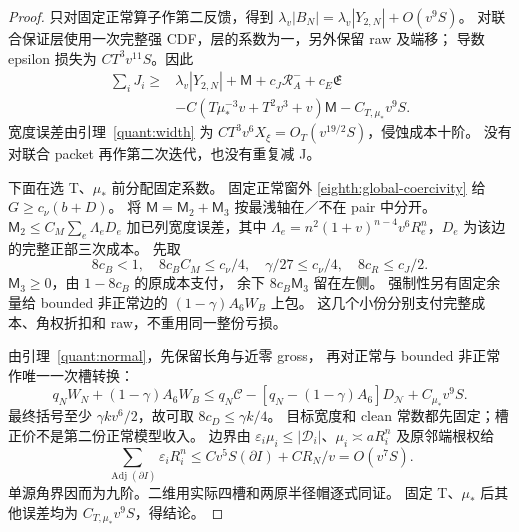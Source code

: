 \begin{proof}
只对固定正常算子作第二反馈，得到
\(\lambda_v|B_N|=\lambda_v|Y_{2,N}|+O(v^9S)\)。
对联合保证层使用一次完整强 CDF，层的系数为一，另外保留 raw 及端移；
导数 epsilon 损失为 \(CT^3v^{11}S\)。因此
\[
 \begin{aligned}
 \sum_iJ_i\ge{}&\lambda_v|Y_{2,N}|+\mathsf M+c_J\mathcal R_A^-+c_E\mathfrak E\\
 &-C(T\mu_*^{-3}v+T^2v^3+v)\mathsf M-C_{T,\mu_*}v^9S.
 \end{aligned}
\]
宽度误差由引理~\ref{quant:width} 为
\(CT^3v^6X_\xi=O_T(v^{19/2}S)\)，侵蚀成本十阶。
没有对联合 packet 再作第二次迭代，也没有重复减 J。

下面在选 T、\(\mu_*\) 前分配固定系数。
固定正常窗外 \eqref{eighth:global-coercivity} 给 \(G\ge c_\nu(b+D)\)。
将 \(\mathsf M=\mathsf M_2+\mathsf M_3\) 按最浅轴在／不在 pair 中分开。
\(\mathsf M_2\le C_M\sum_e\Lambda_eD_e\) 加已列宽度误差，其中
\(\Lambda_e=n^2(1+v)^{n-4}v^6R_e^n\)，\(D_e\) 为该边的完整正部三次成本。
先取
\[
 8c_B<1,\quad8c_BC_M\le c_\nu/4,\quad
 \gamma/27\le c_\nu/4,\quad8c_R\le c_J/2.
\]
\(\mathsf M_3\ge0\)，由 \(1-8c_B\) 的原成本支付，
余下 \(8c_B\mathsf M_3\) 留在左侧。
强制性另有固定余量给 bounded 非正常边的
\((1-\gamma)A_6W_B\) 上包。
这几个小份分别支付完整成本、角权折扣和 raw，不重用同一整份亏损。

由引理~\ref{quant:normal}，先保留长角与近零 gross，
再对正常与 bounded 非正常作唯一一次槽转换：
\[
 q_NW_N+(1-\gamma)A_6W_B
 \le q_N\mathcal C-[q_N-(1-\gamma)A_6]D_{\mathcal N}+C_{\mu_*}v^9S.
\]
最终括号至少 \(\gamma k v^6/2\)，故可取
\(8c_D\le\gamma k/4\)。
目标宽度和 clean 常数都先固定；槽正价不是第二份正常模型收入。
边界由
\(\varepsilon_i\mu_i\le|\mathscr D_i|\)、\(\mu_i\asymp aR_i^n\)
及原邻端根权给
\[
 \sum_{\operatorname{Adj}(\partial I)}\varepsilon_iR_i^n
 \le Cv^5S(\partial I)+CR_N/v=O(v^7S).
\]
单源角界因而为九阶。二维用实际四槽和两原半径帽逐式同证。
固定 T、\(\mu_*\) 后其他误差均为 \(C_{T,\mu_*}v^9S\)，得结论。
\end{proof}

